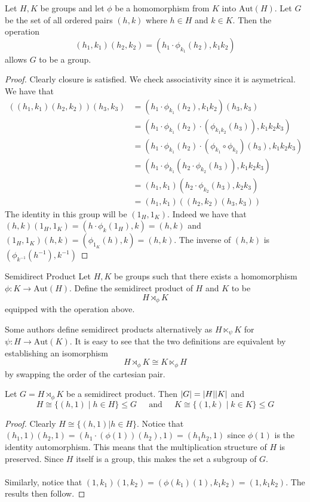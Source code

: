 \documentclass[a4paper]{article}
\begin{document}
\begin{prp}{}{} Let $H,K$ be groups and let $\phi$ be a homomorphism from $K$ into $\text{Aut}(H)$. Let $G$ be the set of all ordered pairs $(h,k)$ where $h\in H$ and $k\in K$. Then the operation $$(h_1,k_1)(h_2,k_2)=\left(h_1\cdot\phi_{k_1}(h_2),k_1k_2\right)$$ allows $G$ to be a group. \tcbline
\begin{proof}
Clearly closure is satisfied. We check associativity since it is asymetrical. We have that 
\begin{align*}
((h_1,k_1)(h_2,k_2))(h_3,k_3)&=\left(h_1\cdot\phi_{k_1}(h_2),k_1k_2\right)(h_3,k_3)\\
&=(h_1\cdot\phi_{k_1}(h_2)\cdot(\phi_{k_1k_2}(h_3)),k_1k_2k_3)\\
&=(h_1\cdot\phi_{k_1}(h_2)\cdot(\phi_{k_1}\circ\phi_{k_2})(h_3),k_1k_2k_3)\\
&=(h_1\cdot\phi_{k_1}(h_2\cdot\phi_{k_2}(h_3)),k_1k_2k_3)\\
&=(h_1,k_1)(h_2\cdot\phi_{k_2}(h_3),k_2k_3)\\
&=(h_1,k_1)((h_2,k_2)(h_3,k_3))
\end{align*}
The identity in this group will be $(1_H,1_K)$. Indeed we have that $(h,k)(1_H,1_K)=(h\cdot\phi_{k}(1_H),k)=(h,k)$ and $(1_H,1_K)(h,k)=(\phi_{1_K}(h),k)=(h,k)$. The inverse of $(h,k)$ is $(\phi_{k^{-1}}(h^{-1}),k^{-1})$
\end{proof}
\end{prp}

\begin{defn}{Semidirect Product}{} Let $H,K$ be groups such that there exists a homomorphism $\phi:K\to\text{Aut}(H)$. Define the semidirect product of $H$ and $K$ to be $$H\rtimes_\phi K$$ equipped with the operation above. 
\end{defn}

Some authors define semidirect products alternatively as $H\ltimes_\psi K$ for $\psi:H\to\text{Aut}(K)$. It is easy to see that the two definitions are equivalent by establishing an isomorphism $$H\rtimes_\phi K\cong K\ltimes_\phi H$$ by swapping the order of the cartesian pair. 

\begin{thm}{}{} Let $G=H\rtimes_\phi K$ be a semidirect product. Then $\abs{G}=\abs{H}\abs{K}$ and $$H\cong\{(h,1)\;|\;h\in H\}\leq G\;\;\;\;\text{ and }\;\;\;\;K\cong\{(1,k)\;|\;k\in K\}\leq G$$ \tcbline
\begin{proof}
Clearly $H\cong\{(h,1)|h\in H\}$. Notice that $(h_1,1)(h_2,1)=(h_1\cdot(\phi(1))(h_2),1)=(h_1h_2,1)$ since $\phi(1)$ is the identity automorphism. This means that the multiplication structure of $H$ is preserved. Since $H$ itself is a group, this makes the set a subgroup of $G$. \\~\\

Similarly, notice that $(1,k_1)(1,k_2)=(\phi(k_1)(1),k_1k_2)=(1,k_1k_2)$. The results then follow. 
\end{proof}
\end{thm}
\end{document}
